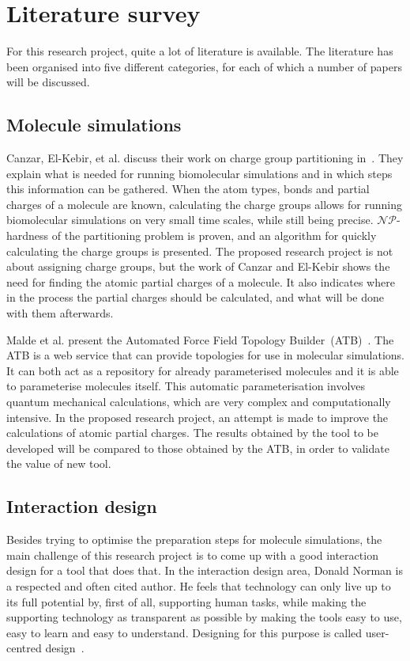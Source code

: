 \chapter{Literature survey}

For this research project, quite a lot of literature is available. The literature has been organised into five different categories, for each of which a number of papers will be discussed.


\section{Molecule simulations}

Canzar, El-Kebir, et al. discuss their work on charge group partitioning in~\cite{canzar2012charge}. They explain what is needed for running biomolecular simulations and in which steps this information can be gathered. When the atom types, bonds and partial charges of a molecule are known, calculating the charge groups allows for running biomolecular simulations on very small time scales, while still being precise. $\mathcal{NP}$-hardness of the partitioning problem is proven, and an algorithm for quickly calculating the charge groups is presented. The proposed research project is not about assigning charge groups, but the work of Canzar and El-Kebir shows the need for finding the atomic partial charges of a molecule. It also indicates where in the process the partial charges should be calculated, and what will be done with them afterwards.

Malde et al. present the Automated Force Field Topology Builder~(ATB)~\cite{malde2011automated}. The ATB is a web service that can provide topologies for use in molecular simulations. It can both act as a repository for already parameterised molecules and it is able to parameterise molecules itself. This automatic parameterisation involves quantum mechanical calculations, which are very complex and computationally intensive. In the proposed research project, an attempt is made to improve the calculations of atomic partial charges. The results obtained by the tool to be developed will be compared to those obtained by the ATB, in order to validate the value of new tool.


\section{Interaction design}

Besides trying to optimise the preparation steps for molecule simulations, the main challenge of this research project is to come up with a good interaction design for a tool that does that. In the interaction design area, Donald Norman is a respected and often cited author. He feels that technology can only live up to its full potential by, first of all, supporting human tasks, while making the supporting technology as transparent as possible by making the tools easy to use, easy to learn and easy to understand. Designing for this purpose is called user-centred design~\cite{norman2002design}.

